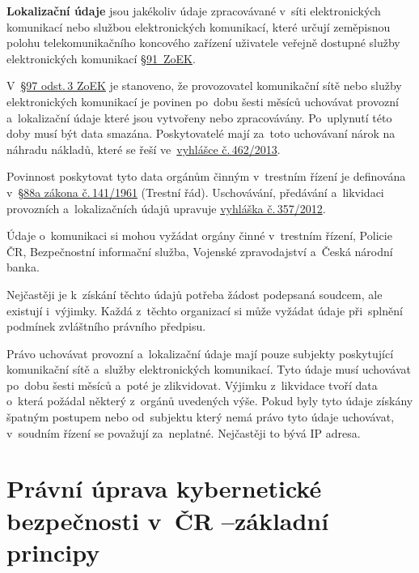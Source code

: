 \textbf{Lokalizační údaje} jsou jakékoliv údaje zpracovávané v~síti elektronických komunikací nebo službou elektronických komunikací, které určují zeměpisnou polohu telekomunikačního koncového zařízení uživatele veřejně dostupné služby elektronických komunikací \href{https://www.zakonyprolidi.cz/cs/2005-127#p91-1}{§91~ZoEK}.

V~\href{https://www.zakonyprolidi.cz/cs/2005-127#p97-3}{§97 odst.\,3 ZoEK} je stanoveno, že provozovatel komunikační sítě nebo služby elektronických komunikací je povinen po~dobu šesti měsíců uchovávat provozní a~lokalizační údaje které jsou vytvořeny nebo zpracovávány. Po~uplynutí této doby musí být data smazána. Poskytovatelé mají za~toto uchovávaní nárok na náhradu nákladů, které se řeší ve~\href{https://www.zakonyprolidi.cz/cs/2013-462/zneni-20140101}{vyhlášce č.\,462/2013}.

Povinnost poskytovat tyto data orgánům činným v~trestním řízení je definována v~\href{https://www.zakonyprolidi.cz/cs/1961-141#p88a}{§88a zákona č.\,141/1961} (Trestní řád). Uschovávání, předávání a~likvidaci provozních a~lokalizačních údajů upravuje \href{https://www.zakonyprolidi.cz/cs/2012-357}{vyhláška č.\,357/2012}.

Údaje o~komunikaci si mohou vyžádat orgány činné v~trestním řízení, Policie ČR, Bezpečnostní informační služba, Vojenské zpravodajství a~Česká národní banka.

Nejčastěji je k~získání těchto údajů potřeba žádost podepsaná soudcem, ale existují i~výjimky. Každá z~těchto organizací si může vyžádat údaje při~splnění podmínek zvláštního právního předpisu.

Právo uchovávat provozní a~lokalizační údaje mají pouze subjekty poskytující komunikační sítě a~služby elektronických komunikací. Tyto údaje musí uchovávat po~dobu šesti měsíců a~poté je zlikvidovat. Výjimku z~likvidace tvoří data o~která požádal některý z~orgánů uvedených výše. Pokud byly tyto údaje získány špatným postupem nebo od~subjektu který nemá právo tyto údaje uchovávat, v~soudním řízení se považují za~neplatné. Nejčastěji to bývá IP adresa.


















\clearpage
\section[Právní úprava kybernetické bezpečnosti v ČR -- základní principy]{Právní úprava kybernetické bezpečnosti v~ČR --\newline základní principy}

